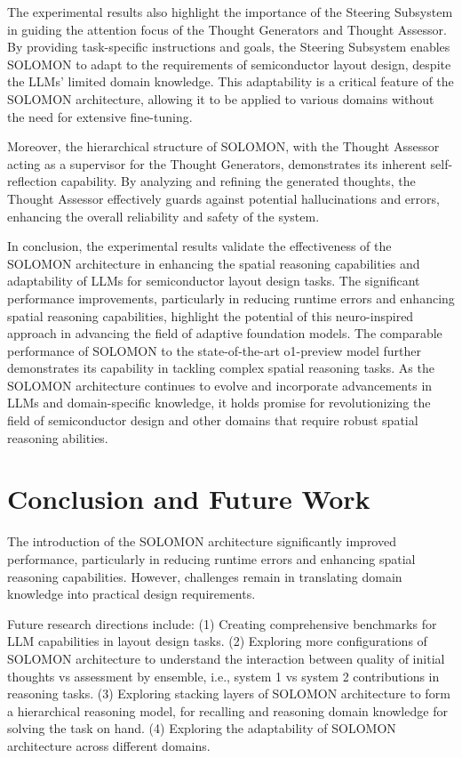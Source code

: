 \documentclass{article}
\begin{document}
The experimental results also highlight the importance of the Steering Subsystem in guiding the attention focus of the Thought Generators and Thought Assessor. By providing task-specific instructions and goals, the Steering Subsystem enables SOLOMON to adapt to the requirements of semiconductor layout design, despite the LLMs' limited domain knowledge. This adaptability is a critical feature of the SOLOMON architecture, allowing it to be applied to various domains without the need for extensive fine-tuning.

Moreover, the hierarchical structure of SOLOMON, with the Thought Assessor acting as a supervisor for the Thought Generators, demonstrates its inherent self-reflection capability. By analyzing and refining the generated thoughts, the Thought Assessor effectively guards against potential hallucinations and errors, enhancing the overall reliability and safety of the system.

In conclusion, the experimental results validate the effectiveness of the SOLOMON architecture in enhancing the spatial reasoning capabilities and adaptability of LLMs for semiconductor layout design tasks. The significant performance improvements, particularly in reducing runtime errors and enhancing spatial reasoning capabilities, highlight the potential of this neuro-inspired approach in advancing the field of adaptive foundation models. The comparable performance of SOLOMON to the state-of-the-art o1-preview model further demonstrates its capability in tackling complex spatial reasoning tasks. As the SOLOMON architecture continues to evolve and incorporate advancements in LLMs and domain-specific knowledge, it holds promise for revolutionizing the field of semiconductor design and other domains that require robust spatial reasoning abilities.

\section{Conclusion and Future Work}
The introduction of the SOLOMON architecture significantly improved performance, particularly in reducing runtime errors and enhancing spatial reasoning capabilities. However, challenges remain in translating domain knowledge into practical design requirements.

Future research directions include:
(1) Creating comprehensive benchmarks for LLM capabilities in layout design tasks.
(2) Exploring more configurations of SOLOMON architecture to understand the interaction between quality of initial thoughts vs assessment by ensemble, i.e., system 1 vs system 2 contributions in reasoning tasks.
(3) Exploring stacking layers of SOLOMON architecture to form a hierarchical reasoning model, for recalling and reasoning domain knowledge for solving the task on hand.
(4) Exploring the adaptability of SOLOMON architecture across different domains.
\end{document}
